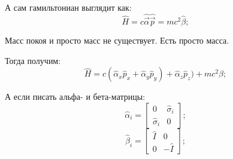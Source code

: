 \documentclass[a4paper, 14pt, russian]{article}
\newcommand{\be}{\begin{equation}}
\newcommand{\ee}{\end{equation}}
\begin{document}
	А сам гамильтониан выглядит как:
	\be
		\hat{H} = c \hat{\vec \alpha} \hat{\vec p} = m c^2 \hat{\beta};
	\ee

	Масс покоя и просто масс не существует. Есть просто масса.

	Тогда получим:
	\be
		\hat{H} = c (\hat{\alpha}_x \hat{p}_x + \hat{\alpha}_y \hat{p}_y ) 
			+ \hat{\alpha}_z \hat{p}_z) + mc^2 \beta;
	\ee

	А если писать альфа- и бета-матрицы:
	\be
			\hat{\alpha}_i = 
				\begin{bmatrix} 
					0 & \hat{\sigma}_i\\
					\hat{\sigma}_i	& 0
				\end{bmatrix};
	\ee
	\be
			\hat{\beta}_i = 
				\begin{bmatrix} 
					\hat{I} & 0\\
					0	& -\hat{I}
				\end{bmatrix};
	\ee
\end{document}
